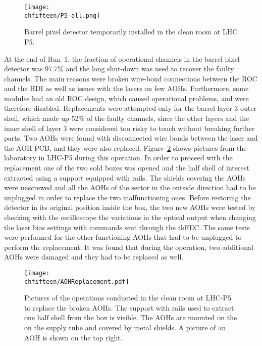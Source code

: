 \begin{figure}[!htb]
 \begin{center}
 \texttt{[image: \\chfifteen/P5-all.png]}
 \end{center}
 \caption{Barrel pixel detector temporarily installed in the clean room at LHC P5.}
 \label{fig:PixP5}
\end{figure}

At the end of Run~1, the fraction of operational channels in the barrel pixel detector was 97.7\% and the long shut-down was used to recover the faulty channels.
The main reasons were broken wire-bond connections between the ROC and the HDI as well as issues with the lasers on few AOHs.
Furthermore, some modules had an old ROC design, which caused operational problems, and were therefore disabled.
Replacements were attempted only for the barrel layer 3 outer shell, which made up 52\% of the faulty channels, since the other layers and the inner shell of layer 3 were considered too risky to touch without breaking further parts.
Two AOHs were found with disconnected wire bonds between the laser and the AOH PCB, and they were also replaced. Figure~\ref{fig:AOHreplace} shows pictures from the laboratory in LHC-P5 during this operation.
In order to proceed with the replacement one of the two cold boxes was opened and the half shell of interest extracted using a support equipped with rails.
The shields covering the AOHs were unscrewed and all the AOHs of the sector in the outside direction had to be unplugged in order to replace the two malfunctioning ones.
Before restoring the detector in its original position inside the box, the two new AOHs were tested by checking with the oscilloscope the variations in the optical output when changing the laser bias settings with commands sent through the tkFEC. The same tests were performed for the other functioning AOHs that had to be unplugged to perform the replacement. It was found that during the operation, two additional AOHs were damaged and they had to be replaced as well.

\begin{figure}[!htb]
 \begin{center}
 \texttt{[image: \\chfifteen/AOHReplacement.pdf]}
 \end{center}
 \caption{Pictures of the operations conducted in the clean room at LHC-P5 to replace the broken AOHs. The support with rails used to extract one half shell from the box is visible.
 The AOHs are mounted on the on the supply tube and covered by metal shields. A picture of an AOH is shown on the top right.}
 \label{fig:AOHreplace}
\end{figure}

